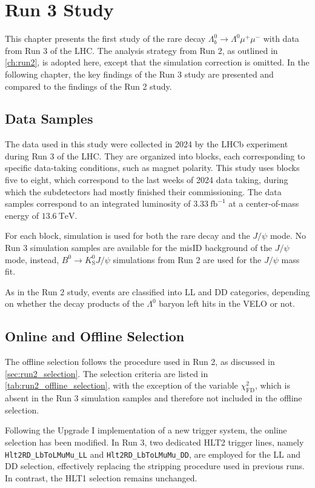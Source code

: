 \chapter{Run 3 Study}
\label{ch:run3}
This chapter presents the first study of the rare decay $\Lambda_b^0 \to \Lambda^0 \mu^+\mu^-$ with data from Run 3 of the LHC. The analysis strategy from Run 2, as outlined in \cref{ch:run2}, is adopted here, except that the simulation correction is omitted. In the following chapter, the key findings of the Run 3 study are presented and compared to the findings of the Run 2 study.


\section{Data Samples}
\label{sec:run3_data_samples}
The data used in this study were collected in 2024 by the LHCb experiment during Run 3 of the LHC. They are organized into blocks, each corresponding to specific data-taking conditions, such as magnet polarity. This study uses blocks five to eight, which correspond to the last weeks of 2024 data taking, during which the subdetectors had mostly finished their commissioning. The data samples correspond to an integrated luminosity of $\qty{3.33}{\femto\barn}^{-1}$ at a center-of-mass energy of $\qty{13.6}{\tera\electronvolt}$.

For each block, simulation is used for both the rare decay and the $J/\psi$ mode. No Run 3 simulation samples are available for the misID background of the $J/\psi$ mode, instead, $B^0 \to K^0_{\text{S}} J/\psi$ simulations from Run 2 are used for the $J/\psi$ mass fit.

As in the Run 2 study, events are classified into LL and DD categories, depending on whether the decay products of the $\Lambda^0$ baryon left hits in the VELO or not.

\section{Online and Offline Selection}
\label{sec:run3_selection}
The offline selection follows the procedure used in Run 2, as discussed in \cref{sec:run2_selection}. The selection criteria are listed in \cref{tab:run2_offline_selection}, with the exception of the variable $\chi^2_{\text{FD}}$, which is absent in the Run 3 simulation samples and therefore not included in the offline selection. 

Following the Upgrade I implementation of a new trigger system, the online selection has been modified. In Run 3, two dedicated HLT2 trigger lines, namely \texttt{Hlt2RD\_LbToLMuMu\_LL} and \texttt{Hlt2RD\_LbToLMuMu\_DD}, are employed for the LL and DD selection, effectively replacing the stripping procedure used in previous runs. In contrast, the HLT1 selection remains unchanged.

